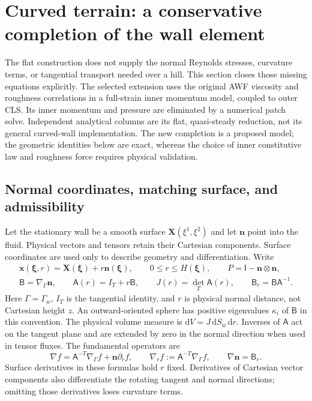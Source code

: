 \documentclass[11pt,a4paper]{article}
\numberwithin{equation}{section}
\newcommand{\dd}{\mathrm{d}}
\newcommand{\I}{\mathsf{I}}
\begin{document}
\section{Curved terrain: a conservative completion of the wall element}
\label{sec:curved}
The flat construction does not supply the normal Reynolds stresses,
curvature terms, or tangential transport needed over a hill. This section
closes those missing equations explicitly. The selected extension uses
the original AWF viscosity and roughness correlations in a full-strain
inner momentum model, coupled to outer CLS. Its inner momentum and
pressure are eliminated by a numerical patch solve. Independent
analytical columns are its flat, quasi-steady reduction, not its general
curved-wall implementation. The new completion is a proposed model;
the geometric identities below are exact, whereas the choice of inner
constitutive law and roughness force requires physical validation.

\subsection{Normal coordinates, matching surface, and admissibility}
Let the stationary wall be a smooth surface $\bm X(\xi^1,\xi^2)$ and
let $\bm n$ point into the fluid. Physical vectors and tensors retain
their Cartesian components. Surface coordinates are used only to
describe geometry and differentiation. Write
\begin{equation}
 \begin{gathered}
 \bm x(\bm\xi,r)=\bm X(\bm\xi)+r\bm n(\bm\xi),
 \qquad 0\leq r\leq H(\bm\xi),\qquad
 P=\I-\bm n\otimes\bm n,\\
 \mathsf B=\nabla_\Gamma\bm n,\qquad \mathsf A(r)=I_T+r\mathsf B,\qquad
 J(r)=\det_T \mathsf A(r),\qquad \mathsf B_r=\mathsf B\mathsf A^{-1}.
 \end{gathered}
 \label{eq:curve-map}
\end{equation}
Here $\Gamma=\Gamma_w$, $I_T$ is the tangential identity, and $r$ is
physical normal distance, not Cartesian height $z$. An outward-oriented
sphere has positive eigenvalues $\kappa_i$ of $\mathsf B$ in this convention.
The physical volume measure is $\dd V=J\,\dd S_w\,\dd r$.
Inverses of $\mathsf A$ act on the tangent plane
and are extended by zero in the normal direction when used in tensor
fluxes. The fundamental operators are
\begin{equation}
 \nabla f=\mathsf A^{-T}\nabla_\Gamma f+\bm n\partial_r f,
 \qquad \nabla_r f:=\mathsf A^{-T}\nabla_\Gamma f,
 \qquad \nabla\bm n=\mathsf B_r.
 \label{eq:curve-grad}
\end{equation}
Surface derivatives in these formulas hold $r$ fixed. Derivatives of
Cartesian vector components also differentiate the rotating tangent and
normal directions; omitting those derivatives loses curvature terms.
\end{document}
